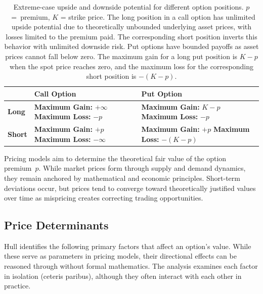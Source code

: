 \documentclass[english,12pt,a4paper,pdftex,sci,utf8]{aaltothesis}
\begin{document}
\begin{table}[!htb]
\centering
\caption{Extreme-case upside and downside potential for different option positions. \mbox{$p$ = premium}, $K$ = strike price. The long position in a call option has unlimited upside potential due to theoretically unbounded underlying asset prices, with losses limited to the premium paid. The corresponding short position inverts this behavior with unlimited downside risk. Put options have bounded payoffs as asset prices cannot fall below zero. The maximum gain for a long put position is $K-p$ when the spot price reaches zero, and the maximum loss for the corresponding short position is $-(K-p)$.}\label{tab:options_table}
\begin{tabular}{|l|p{5cm}|p{5cm}|}
\hline
\textbf{} & \textbf{Call Option} & \textbf{Put Option} \\
\hline
\textbf{Long} & \textbf{Maximum Gain:} $+\infty$
\newline \textbf{Maximum Loss:} $-p$ & \textbf{Maximum Gain:} $K-p$
\newline \textbf{Maximum Loss:} $-p$ \\
\hline
\textbf{Short} & \textbf{Maximum Gain:} $+p$
\newline \textbf{Maximum Loss:} $-\infty$ & \textbf{Maximum Gain:} $+p$
\newline \textbf{Maximum Loss:} $-(K-p)$ \\
\hline
\end{tabular}
\end{table}
Pricing models aim to determine the theoretical fair value of the option \mbox{premium $p$.} While market prices form through supply and demand dynamics, they remain anchored by mathematical and economic principles. Short-term deviations occur, but prices tend to converge toward theoretically justified values over time as mispricing creates correcting trading opportunities.

\subsection{Price Determinants}

Hull \cite{hull2018} identifies the following primary factors that affect an option's value. While these serve as parameters in pricing models, their directional effects can be reasoned through without formal mathematics. The analysis examines each factor in isolation (ceteris paribus), although they often interact with each other in practice.
\end{document}
